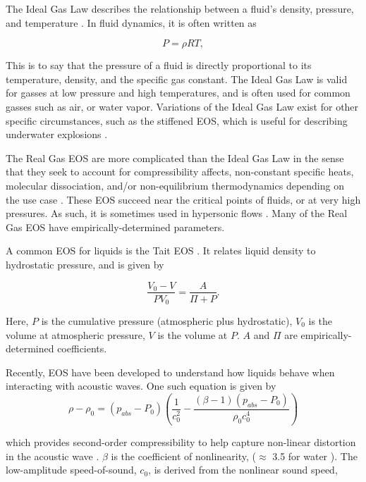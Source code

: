 \documentclass{UCF_ETD}
\begin{document}
The Ideal Gas Law describes the relationship between a fluid's density, pressure, and temperature \cite{clapeyron1834}. In fluid dynamics, it is often written as

\begin{equation}
    P = \rho R T,
    \label{eq:idealGasLaw}
\end{equation}

This is to say that the pressure of a fluid is directly proportional to its temperature, density, and the specific gas constant. The Ideal Gas Law is valid for gasses at low pressure and high temperatures, and is often used for common gasses such as air, or water vapor. Variations of the Ideal Gas Law exist for other specific circumstances, such as the stiffened EOS, which is useful for describing underwater explosions \cite{stiffenedGas}.

The Real Gas EOS are more complicated than the Ideal Gas Law in the sense that they seek to account for compressibility affects, non-constant specific heats, molecular dissociation, and/or non-equilibrium thermodynamics depending on the use case \cite{vanderwaals, peng-robinson, redlich1949thermodynamics}. These EOS succeed near the critical points of fluids, or at very high pressures. As such, it is sometimes used in hypersonic flows \cite{anderson2019hypersonic}. Many of the Real Gas EOS have empirically-determined parameters. 

A common EOS for liquids is the Tait EOS \cite{tait1888physics}. It relates liquid density to hydrostatic pressure, and is given by

\begin{equation}
    \frac{V_{0} - V}{PV_{0}} = \frac{A}{\Pi + P}.
    \label{eq:tait}
\end{equation}

Here, $P$ is the cumulative pressure (atmospheric plus hydrostatic), $V_{0}$ is the volume at atmospheric pressure, $V$ is the volume at $P$. $A$ and $\Pi$ are empirically-determined coefficients. 

Recently, EOS have been developed to understand how liquids behave when interacting with acoustic waves. One such equation is given by
\begin{equation}
    \rho - \rho_{0} = \left( p_{abs} - P_{0} \right) \left( \frac{1}{c_{0}^{2}} - \frac{\left( \beta - 1 \right) \left( p_{abs} - P_{0} \right) }{\rho_{0} c_{0}^{4}} \right)
    \label{eq:hamiltonEOS}
\end{equation}

which provides second-order compressibility to help capture non-linear distortion in the acoustic wave \cite{hamilton2008nonlinear}. $\beta$ is the coefficient of nonlinearity, ($\approx$ 3.5 for water \cite{Esplin2016}). The low-amplitude speed-of-sound, $c_{0}$, is derived from the nonlinear sound speed,
\end{document}
